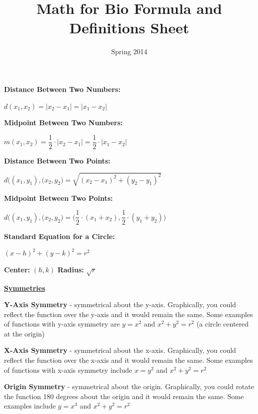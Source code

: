 \documentclass[12pt]{article}
\newenvironment{myindentpar}[1]%
     {\begin{list}{}%
             {\setlength{\leftmargin}{#1}}%
             \item[]%
     }
     {\end{list}}
\begin{document}
\title{Math for Bio Formula and Definitions Sheet}
\date{Spring 2014}
\author{}
\maketitle

\textbf{Distance Between Two Numbers:} 
\newline

\centerline{$d(x_{1},x_{2}) = |x_{2}-x_{1}| = |x_{1}-x_{2}|$}

\textbf{Midpoint Between Two Numbers:} 
\newline

\centerline{$m(x_{1},x_{2}) = \dfrac{1}{2} \cdot |x_{2}-x_{1}| = \dfrac{1}{2} \cdot |x_{1}-x_{2}|$}

\textbf{Distance Between Two Points:} 
\newline

\centerline{$d \Big((x_{1},y_{1}),(x_{2},y_{2}\Big) = \sqrt{(x_{2}-x_{1})^2+(y_{2}-y_{1})^2}$}

\textbf{Midpoint Between Two Points:} 
\newline

\centerline{$d \Big((x_{1},y_{1}),(x_{2},y_{2}\Big) =\Big(\dfrac{1}{2} \cdot (x_{1}+x_{2}), \dfrac{1}{2} \cdot (y_{1}+y_{2})\Big)$}

\textbf{Standard Equation for a Circle:} 
\newline

\centerline{$(x-h)^2+(y-k)^2=r^2$}
\vspace{.5cm}
\centerline{\textbf{Center:} $(h,k)$ \hspace{2cm} \textbf{Radius:} $\sqrt{r}$}

\newpage
{\bf \underline{Symmetries}}

\begin{myindentpar}{1cm}
\textbf{Y-Axis Symmetry} - symmetrical about the y-axis. Graphically, you could reflect the function over the y-axis and it would remain the same. Some examples of functions with y-axis symmetry are $y=x^2$ and $x^2+y^2=r^2$ (a circle centered at the origin)

\textbf{X-Axis Symmetry} - symmetrical about the x-axis. Graphically, you could reflect the function over the x-axis and it would remain the same. Some examples of functions with x-axis symmetry include $x=y^2$ and $x^2+y^2=r^2$

\textbf{Origin Symmetry} - symmetrical about the origin. Graphically, you could rotate the function 180 degrees about the origin and it would remain the same. Some examples include $y=x^3$ and $x^2+y^2=r^2$
\end{myindentpar}
\end{document}
